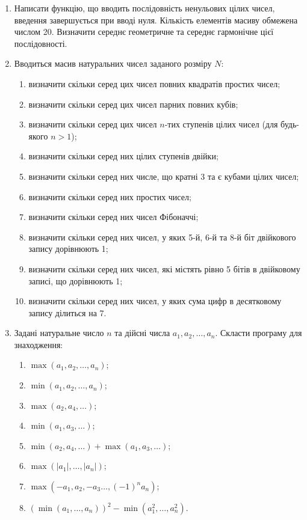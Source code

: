 \documentclass[a5paper,titlepage,openany,twoside,
]
{book_unv}%
\makeatletter
\newcommand{\xslalph}[1]{\expandafter\@xslalph\csname c@#1\endcsname}
\newcommand{\@xslalph}[1]{%
    \ifcase#1\or а\or б\or в\or г\or д\or e\or є\or ж\or з\or i%
    \or й\or к\or л\or м\or н\or о\or п\or р\or с\or т%
    \or у\or ф\or х\or ц\or ч\or ш\or ю\or я\or аа\or бб\or вв%
    \else\@ctrerr\fi%
}
\makeatother
\begin{document}
\begin{enumerate}
\def\labelenumi{\arabic{enumi})}
\setcounter{enumi}{6}
\item
  Написати функцію, що вводить послідовність ненульових цілих чисел,
  введення завершується при вводі нуля. Кількість елементів масиву
  обмежена числом 20. Визначити середнє геометричне та середнє гармонічне
  цієї послідовності.
\item
  Вводиться масив натуральних чисел заданого розміру $N$:
\begin{enumerate}[label=\xslalph*)]
\item визначити скільки серед цих чисел повних квадратів простих чисел;
\item визначити скільки серед цих чисел парних повних кубів;
\item визначити скільки серед цих чисел $n$-тих ступенів цілих чисел (для
будь-якого $n>1$);
\item визначити скільки серед них цілих ступенів двійки;
\item визначити скільки серед них числе, що кратні 3 та є кубами цілих чисел;
\item визначити скільки серед них простих чисел;
\item визначити скільки серед них чисел Фібоначчі;
\item визначити скільки серед них чисел, у яких 5-й, 6-й та 8-й біт
двійкового запису дорівнюють 1;
\item визначити скільки серед них чисел, які містять рівно 5 бітів в
двійковому записі, що дорівнюють 1;
\item визначити скільки серед них чисел, у яких сума цифр в десятковому
запису ділиться на 7.
 \end{enumerate}

\item Задані натуральне число \(n\) та дійсні числа
\(a_{1},a_{2},\ldots,a_{n}\). Скласти програму для знаходження:
  \begin{multicols}{2}
\begin{enumerate}[label=\xslalph*)]
\item
 \(\max\left( a_{1},a_{2},\ldots,a_{n} \right)\); 
\item
\(\min\left( a_{1},a_{2},\ldots,a_{n} \right)\);
\item \(\max\left( a_{2},a_{4},\ldots \right)\); 
\item
\(\min\left( a_{1},a_{3},\ldots \right)\);
\item
\(\min\left( a_{2},a_{4},\ldots \right) + \max\left( a_{1},a_{3},\ldots \right)\);
\item
\(\max\left( \left| a_{1} \right|,\ldots,\left| a_{n} \right| \right)\);
\item \(\max\left( -a_{1},a_{2}, -a_{3}\ldots,(-1)^{n}a_{n} \right)\);
\item
\(\left( \min\left( a_{1},\ldots,a_{n} \right) \right)^{2} - \min\left( a_{1}^{2},\ldots,a_{n}^{2} \right)\).


\end{enumerate}
\end{multicols}
\end{enumerate}
\end{document}
